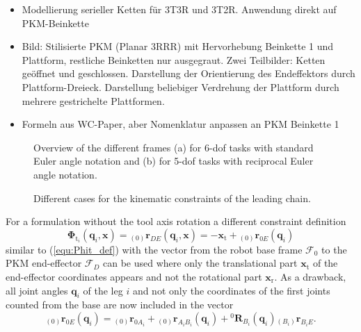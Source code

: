\documentclass[robotics,article,submit,moreauthors,pdftex]{Definitions/mdpi}
\newcommand{\bm}[1]{\boldsymbol{#1}}
\newcommand{\ortvek}[4]{{ }_{(#1)}{\boldsymbol{#2}}^{#3}_{#4} }
\newcommand{\rotmat}[2]{{{ }^{#1}\boldsymbol{R}}_{#2}}
\newcommand{\ks}[1]{{\mathcal{F}}_{#1}}
\begin{document}
\cite{1_SchapplerTapOrt2019}

\begin{itemize}
    \item Modellierung serieller Ketten für 3T3R und 3T2R. Anwendung direkt auf PKM-Beinkette
    \item Bild: Stilisierte PKM (Planar 3RRR) mit Hervorhebung Beinkette 1 und Plattform, restliche Beinketten nur ausgegraut. Zwei Teilbilder: Ketten geöffnet und geschlossen. Darstellung der Orientierung des Endeffektors durch Plattform-Dreieck. Darstellung beliebiger Verdrehung der Plattform durch mehrere gestrichelte Plattformen.
    \item Formeln aus WC-Paper, aber Nomenklatur anpassen an PKM Beinkette 1
\end{itemize}

\begin{figure}[tb]
    
    \caption{Overview of the different frames (a) for 6-dof tasks with standard Euler angle notation and (b) for 5-dof tasks with reciprocal Euler angle notation.}
    \label{fig:frames_5dof_6dof}
\end{figure} 


\begin{figure}[tb]
    
    \caption{Different cases for the kinematic constraints of the leading chain.}
    \label{fig:pkm_constr_rot_lead}
\end{figure} 


For a formulation without the tool axis rotation a different constraint definition
%
\begin{equation}
\bm{\Phi}_{\mathrm{t}_i}(\bm{q}_i,\bm{x}) = 
\ortvek{0}{r}{}{DE}(\bm{q}_i,\bm{x}) =
- \bm{x}_{\mathrm{t}} + \ortvek{0}{r}{}{0E}(\bm{q}_i) 
\end{equation}
%
similar to (\ref{equ:Phit_def}) with the vector from the robot base frame $\ks{0}$ to the PKM end-effector $\ks{D}$ can be used where 
only the translational part $\bm{x}_{\mathrm{t}}$ of the end-effector coordinates appears and not the rotational part $\bm{x}_{\mathrm{r}}$.
As a drawback, all joint angles $\bm{q}_i$ of the leg $i$ and not only the coordinates of the first joints counted from the base are now included
in the vector
%
\begin{equation}
\ortvek{0}{r}{}{0E}(\bm{q}_i) = 
\ortvek{0}{r}{}{0A_i}
+ \ortvek{0}{r}{}{A_iB_i}(\bm{q}_i) + \rotmat{0}{B_i}(\bm{q}_i) \ortvek{B_i}{r}{}{B_iE}.
\end{equation}
%
\end{document}
